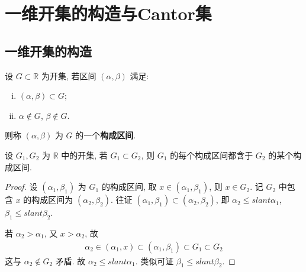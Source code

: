 \documentclass[../../main.tex]{subfiles}
\begin{document}
\section{一维开集的构造与Cantor集}

\subsection{一维开集的构造}

\begin{definition}[构成区间]
设 $G \subset \mathbb{R}$ 为开集, 若区间 $(\alpha, \beta)$ 满足:
\begin{enumerate}[(i)]
\item $(\alpha, \beta) \subset G$;
\item $\alpha \notin G$, $\beta \notin G$.
\end{enumerate}
则称 $(\alpha, \beta)$ 为 $G$ 的一个\textbf{构成区间}.
\end{definition}

\begin{proposition}
设 $G_1, G_2$ 为 $\mathbb{R}$ 中的开集, 若 $G_1 \subset G_2$, 则 $G_1$ 的每个构成区间都含于 $G_2$ 的某个构成区间.
\end{proposition}
\begin{proof}
 设 $(\alpha_1, \beta_1)$ 为 $G_1$ 的构成区间, 取 $x \in (\alpha_1, \beta_1)$, 则 $x \in G_2$. 记 $G_2$ 中包含 $x$ 的构成区间为 $(\alpha_2, \beta_2)$. 往证 $(\alpha_1, \beta_1) \subset (\alpha_2, \beta_2)$, 即 $\alpha_2 \leqslant slant \alpha_1$, $\beta_1 \leqslant slant \beta_2$.

若 $\alpha_2 > \alpha_1$, 又 $x > \alpha_2$, 故
\begin{align*}
\alpha_2 \in (\alpha_1, x) \subset (\alpha_1, \beta_1) \subset G_1 \subset G_2
\end{align*}
这与 $\alpha_2 \notin G_2$ 矛盾. 故 $\alpha_2 \leqslant slant \alpha_1$. 类似可证 $\beta_1 \leqslant slant \beta_2$.
\end{proof}
\end{document}
